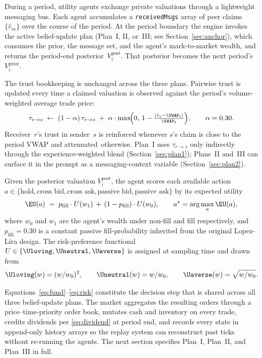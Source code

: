 During a period, utility agents exchange private valuations through
a lightweight messaging bus. Each agent accumulates a
\texttt{receivedMsgs} array of peer claims $\{\hat v_m\}$ over the
course of the period. At the period boundary the engine invokes the
active belief-update plan (Plan~I, II, or~III; see
Section~\ref{sec:anchor}), which consumes the prior, the message
set, and the agent's mark-to-market wealth, and returns the
period-end posterior~$V_i^{\text{post}}$. That posterior becomes the
next period's~$V_i^{\text{prior}}$.

The trust bookkeeping is unchanged across the three plans. Pairwise
trust is updated every time a claimed valuation is observed against
the period's volume-weighted average trade price:
\begin{equation}
\tau_{r\to s}\;\leftarrow\;(1-\alpha)\,\tau_{r\to s}
\;+\;\alpha\cdot\max\!\Bigl(0,\,1-\tfrac{|\hat v_s-\VWAP_t|}{\VWAP_t}\Bigr),\qquad
\alpha=0.30.
\label{eq:trust}
\end{equation}
Receiver~$r$'s trust in sender~$s$ is reinforced whenever $s$'s
claim is close to the period VWAP and attenuated~otherwise. Plan~I
uses $\tau_{r\to s}$ only indirectly through the
experience-weighted blend (Section~\ref{sec:plan1}); Plans~II
and~III can surface it in the prompt as a messaging-context
variable (Section~\ref{sec:plan2}).

Given the posterior valuation $V_i^{\text{post}}$, the agent scores
each available action $a\in\{\text{hold},\text{cross bid},\text{cross ask},
\text{passive bid},\text{passive ask}\}$ by its expected utility
\begin{equation}
\EU(a)\;=\;p_{\text{fill}}\cdot U(w_1)\,+\,(1-p_{\text{fill}})\cdot U(w_0),
\qquad a^\star=\arg\max_{a}\EU(a),
\label{eq:eu}
\end{equation}
where $w_0$ and $w_1$ are the agent's wealth under non-fill and
fill respectively, and $p_{\text{fill}}=0.30$ is a constant passive
fill-probability inherited from the original Lopez-Lira design. The
risk-preference functional $U\in\{\Uloving,\Uneutral,\Uaverse\}$ is
assigned at sampling time and drawn from
\begin{equation}
\Uloving(w)=(w/w_0)^{2},\qquad
\Uneutral(w)=w/w_0,\qquad
\Uaverse(w)=\sqrt{w/w_0}.
\label{eq:risk}
\end{equation}

Equations~\eqref{eq:fund}--\eqref{eq:risk} constitute the decision
step that is shared across all three belief-update plans. The
market aggregates the resulting orders through a price--time-priority
order book, mutates cash and inventory on every trade, credits
dividends per \eqref{eq:dividend} at period end, and records every
state in append-only history arrays so the replay system can
reconstruct past ticks without re-running the agents. The next
section specifies Plan~I, Plan~II, and Plan~III in full.
